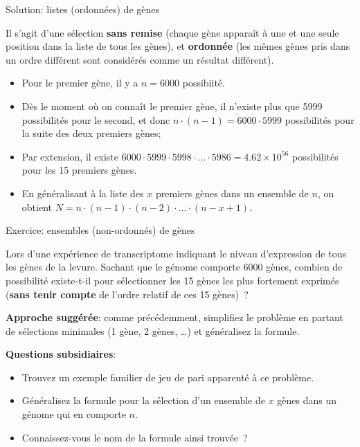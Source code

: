 \documentclass[ignorenonframetext,]{beamer}
\providecommand{\tightlist}{%
  \setlength{\itemsep}{0pt}\setlength{\parskip}{0pt}}
\begin{document}
\begin{frame}{Solution: listes (ordonnées) de gènes}

Il s'agit d'une sélection \textbf{sans remise} (chaque gène apparaît à
une et une seule position dans la liste de tous les gènes), et
\textbf{ordonnée} (les mêmes gènes pris dans un ordre différent sont
considérés comme un résultat différent).

\begin{itemize}
\tightlist
\item
  Pour le premier gène, il y a \(n=6000\) possibiité.
\item
  Dès le moment où on connaît le premier gène, il n'existe plus que 5999
  possibilités pour le second, et donc
  \(n \cdot (n-1) = 6000 \cdot 5999\) possibilités pour la suite des
  deux premiers gènes;
\item
  Par extension, il existe
  \(6000 \cdot 5999 \cdot 5998 \cdot \ldots \cdot 5986 = 4.62\times 10^{56}\)
  possibilités pour les 15 premiers gènes.
\item
  En généralisant à la liste des \(x\) premiers gènes dans un ensemble
  de \(n\), on obtient
  \(N = n \cdot (n-1) \cdot (n-2) \cdot ... \cdot (n-x+1)\).
\end{itemize}

\end{frame}

\begin{frame}{Exercice: ensembles (non-ordonnés) de gènes}

Lors d'une expérience de transcriptome indiquant le niveau d'expression
de tous les gènes de la levure. Sachant que le génome comporte 6000
gènes, combien de possibilité existe-t-il pour sélectionner les 15 gènes
les plus fortement exprimés (\textbf{sans tenir compte} de l'ordre
relatif de ces 15 gènes)~?

\textbf{Approche suggérée}: comme précédemment, simplifiez le problème
en partant de sélections minimales (1 gène, 2 gènes, \ldots{}) et
généralisez la formule.

\textbf{Questions subsidiaires}:

\begin{itemize}
\tightlist
\item
  Trouvez un exemple familier de jeu de pari apparenté à ce problème.
\item
  Généralisez la formule pour la sélection d'un ensemble de \(x\) gènes
  dans un génome qui en comporte \(n\).
\item
  Connaissez-vous le nom de la formule ainsi trouvée~?
\end{itemize}

\end{frame}
\end{document}
